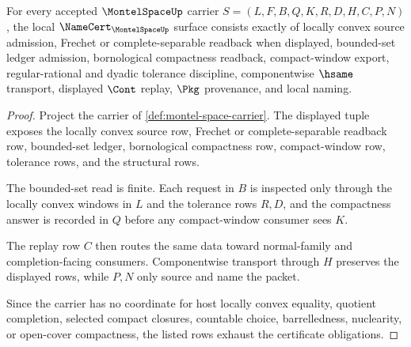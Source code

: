 \begin{theorem}
\label{thm:montel-space-namecert-obligations}
For every accepted $\MontelSpaceUp$ carrier $S=(L,F,B,Q,K,R,D,H,C,P,N)$, the local $\NameCert_{\MontelSpaceUp}$ surface consists exactly of locally convex source admission, Frechet or complete-separable readback when displayed, bounded-set ledger admission, bornological compactness readback, compact-window export, regular-rational and dyadic tolerance discipline, componentwise $\hsame$ transport, displayed $\Cont$ replay, $\Pkg$ provenance, and local naming.
\end{theorem}
\begin{proof}
Project the carrier of \autoref{def:montel-space-carrier}. The displayed tuple exposes the locally convex source row, Frechet or complete-separable readback row, bounded-set ledger, bornological compactness row, compact-window row, tolerance rows, and the structural rows.

The bounded-set read is finite. Each request in $B$ is inspected only through the locally convex windows in $L$ and the tolerance rows $R,D$, and the compactness answer is recorded in $Q$ before any compact-window consumer sees $K$.

The replay row $C$ then routes the same data toward normal-family and completion-facing consumers. Componentwise transport through $H$ preserves the displayed rows, while $P,N$ only source and name the packet.

Since the carrier has no coordinate for host locally convex equality, quotient completion, selected compact closures, countable choice, barrelledness, nuclearity, or open-cover compactness, the listed rows exhaust the certificate obligations.
\end{proof}

